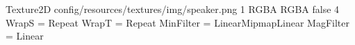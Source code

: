 Texture2D
config/resources/textures/img/speaker.png
1
RGBA
RGBA
false
4
WrapS = Repeat
WrapT = Repeat
MinFilter = LinearMipmapLinear
MagFilter = Linear
